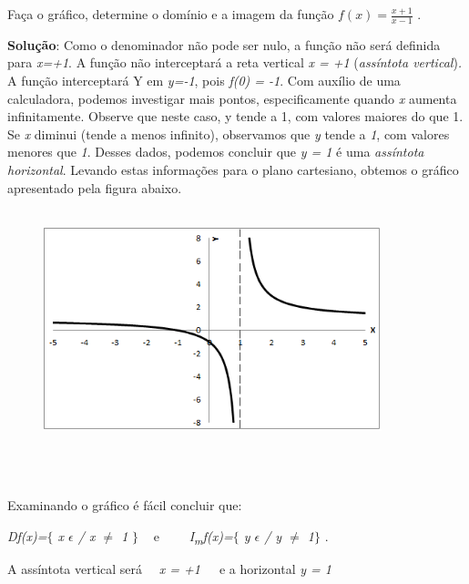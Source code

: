\begin{texemplo}
Faça o gráfico, determine o domínio e a imagem da função  \( f \left( x \right) =\frac{x+1}{x-1} \) .

\textbf{Solução}: Como o denominador não pode ser nulo, a função não será definida para \textit{x=+1}. A função não interceptará a reta vertical \textit{x = +1 }(\textit{assíntota vertical})\textit{. }A função interceptará Y em \textit{y=-1}, pois \textit{f(0) = -1}. Com auxílio de uma calculadora, podemos investigar mais pontos, especificamente quando \textit{x} aumenta infinitamente. Observe que neste caso, y tende a 1, com valores maiores do que 1. Se \textit{x} diminui (tende a menos infinito), observamos que \textit{y} tende a \textit{1}, com valores menores que \textit{1}. Desses dados, podemos concluir que \textit{y = 1} é uma \textit{assíntota horizontal}. Levando estas informações para o plano cartesiano, obtemos o gráfico apresentado pela figura abaixo.

\begin{figure}[H]
	\begin{Center}
		\includegraphics[width=3.86in,height=2.74in]{capitulos/outras_funcoes/media/image13.png}
	\end{Center}
\end{figure}

~~

\quad Examinando o gráfico é fácil concluir que: 

\quad \textit{Df(x)=$ \{ $  x $ \epsilon $  \textbf{ }/ x $ \neq $  1} \textit{$ \} $ ~ } e~~~~ \textit{I\textsubscript{m}f(x)=$ \{ $ y $ \epsilon $   / y $ \neq $  1$ \} $ }. 

\quad A assíntota vertical será~~ \textit{x = +1}~~~e a horizontal  \textit{y = 1} \textit{  }\qedsymbol{} 
\end{texemplo}

